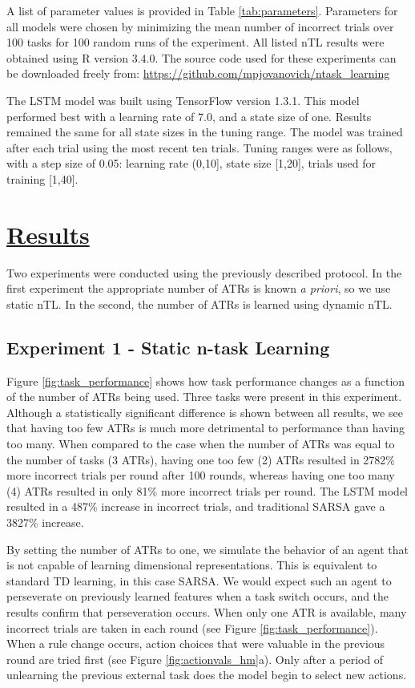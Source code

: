 \documentclass[10pt,letterpaper]{article}
\begin{document}
A list of parameter values is provided in Table \ref{tab:parameters}. Parameters for all models were chosen by minimizing the mean number of incorrect trials over 100 tasks for 100 random runs of the experiment. All listed nTL results were obtained using R version 3.4.0. The source code used for these experiments can be downloaded freely from: \url{https://github.com/mpjovanovich/ntask\_learning}

The LSTM model was built using TensorFlow version 1.3.1. This model performed best with a learning rate of 7.0, and a state size of one. Results remained the same for all state sizes in the tuning range. The model was trained after each trial using the most recent ten trials. Tuning ranges were as follows, with a step size of 0.05: learning rate (0,10], state size [1,20], trials used for training [1,40].

\section{\underline{Results}}

Two experiments were conducted using the previously described protocol. In the first experiment the appropriate number of ATRs is known \textit{a priori}, so we use static nTL. In the second, the number of ATRs is learned using dynamic nTL. 

\subsection{Experiment 1 - Static n-task Learning}

Figure \ref{fig:task_performance} shows how task performance changes as a function of the number of ATRs being used. Three tasks were present in this experiment. Although a statistically significant difference is shown between all results, we see that having too few ATRs is much more detrimental to performance than having too many. When compared to the case when the number of ATRs was equal to the number of tasks (3 ATRs), having one too few (2) ATRs resulted in 2782\% more incorrect trials per round after 100 rounds, whereas having one too many (4) ATRs resulted in only 81\% more incorrect trials per round. The LSTM model resulted in a 487\% increase in incorrect trials, and traditional SARSA gave a 3827\% increase.

By setting the number of ATRs to one, we simulate the behavior of an agent that is not capable of learning dimensional representations. This is equivalent to standard TD learning, in this case SARSA. We would expect such an agent to perseverate on previously learned features when a task switch occurs, and the results confirm that perseveration occurs. When only one ATR is available, many incorrect trials are taken in each round (see Figure \ref{fig:task_performance}). When a rule change occurs, action choices that were valuable in the previous round are tried first (see Figure \ref{fig:actionvals_hm}a). Only after a period of unlearning the previous external task does the model begin to select new actions. 
\end{document}
